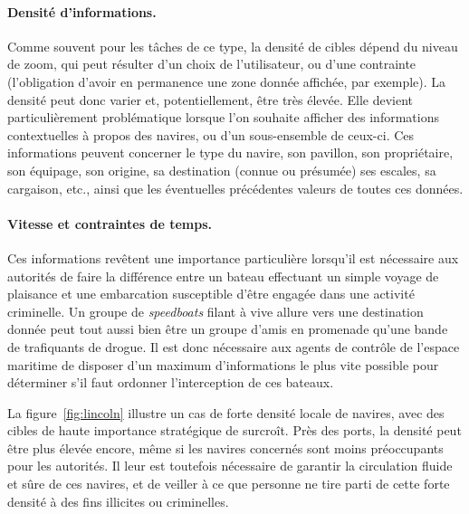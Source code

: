 	\paragraph{Densité d'informations.}
	Comme souvent pour les tâches de ce type, la densité de cibles dépend du niveau de zoom, qui peut résulter d'un choix de l'utilisateur, ou d'une contrainte (l'obligation d'avoir en permanence une zone donnée affichée, par exemple). La densité peut donc varier et, potentiellement, être très élevée. Elle devient particulièrement problématique lorsque l'on souhaite afficher des informations contextuelles à propos des navires, ou d'un sous-ensemble de ceux-ci. Ces informations peuvent concerner le type du navire, son pavillon, son propriétaire, son équipage, son origine, sa destination (connue ou présumée) ses escales, sa cargaison, etc., ainsi que les éventuelles précédentes valeurs de toutes ces données.
	
	\paragraph{Vitesse et contraintes de temps.}
	Ces informations revêtent une importance particulière lorsqu'il est nécessaire aux autorités de faire la différence entre un bateau effectuant un simple voyage de plaisance et une embarcation susceptible d'être engagée dans une activité criminelle. Un groupe de \emph{speedboats} filant à vive allure vers une destination donnée peut tout aussi bien être un groupe d'amis en promenade qu'une bande de trafiquants de drogue. Il est donc nécessaire aux agents de contrôle de l'espace maritime de disposer d'un maximum d'informations le plus vite possible pour déterminer s'il faut ordonner l'interception de ces bateaux.
	
	La figure~\ref{fig:lincoln} illustre un cas de forte densité locale de navires, avec des cibles de haute importance stratégique de surcroît. Près des ports, la densité peut être plus élevée encore, même si les navires concernés sont moins préoccupants pour les autorités. Il leur est toutefois nécessaire de garantir la circulation fluide et sûre de ces navires, et de veiller à ce que personne ne tire parti de cette forte densité à des fins illicites ou criminelles.
	
